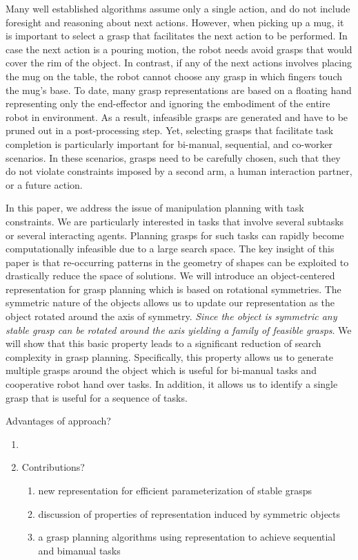 \documentclass{aamas2015}
\begin{document}
Many well established algorithms assume only a single action, 
and do not include foresight and reasoning about next 
actions. However, when picking up a mug, it is 
important to select a grasp that facilitates
the next action to be performed. In case the next action 
is a pouring motion, the robot needs avoid grasps that would 
cover the rim of the object. In contrast, if any of the 
next actions involves placing the mug on the table, the 
robot cannot choose any grasp in which fingers touch 
the mug's base. To date, many grasp representations 
are based on a floating hand representing only the 
end-effector and ignoring the embodiment of the 
entire robot in environment. As a result, infeasible grasps 
are generated and have to be pruned out in a post-processing 
step. Yet, selecting grasps that facilitate task completion is 
particularly important for bi-manual, sequential, 
and co-worker scenarios. In these scenarios, grasps
need to be carefully chosen, such that they do not violate
constraints imposed by a second arm, a human interaction
partner, or a future action. 

In this paper, we address the issue of manipulation planning with task
constraints. We are particularly interested in tasks that involve several
subtasks or several interacting agents. Planning grasps for such 
tasks can rapidly become computationally infeasible due to a large
search space. The key insight of this paper is that re-occurring
patterns in the geometry of shapes can be exploited to drastically
reduce the space of solutions. We will introduce an object-centered
representation for grasp planning which is based on rotational symmetries.
The symmetric nature of the objects allows us to update our representation
as the object rotated around the axis of symmetry. \emph{Since the object is symmetric any stable grasp can be rotated around the axis yielding a family of feasible grasps}. We will show that this basic property leads to a significant reduction of search complexity in grasp planning. Specifically, this property allows us to generate multiple grasps around the object which is useful for bi-manual tasks and cooperative robot hand over tasks. In addition, it allows us to identify a single grasp that is useful for a sequence of tasks.




	

\item Advantages of approach?
	\begin{enumerate}
	\item 
	
\item Contributions?
	\begin{enumerate}
	\item new representation for efficient parameterization of stable grasps 	
	\item discussion of properties of representation induced by symmetric objects
	\item a grasp planning algorithms using representation to achieve sequential and 
		  bimanual tasks  
	\end{enumerate}
	\end{enumerate}
	
\end{document}
